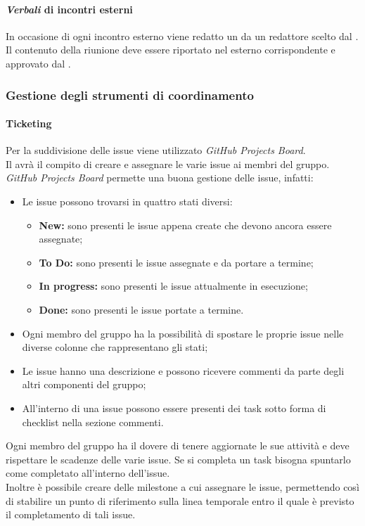 \paragraph {\textit{Verbali} di incontri esterni}
In occasione di ogni incontro esterno viene redatto un \docNameVLow{} da un redattore scelto dal \roleProjectManagerLow. Il contenuto della riunione deve essere riportato nel \docNameVLow{} esterno corrispondente e approvato dal \roleProjectManagerLow.

\subsubsection{Gestione degli strumenti di coordinamento}
\paragraph{Ticketing}
Per la suddivisione delle issue\glo{} viene utilizzato \textit{GitHub Projects Board}\glo{}.\\
Il \roleProjectManagerLow{} avrà il compito di creare e assegnare le varie issue\glo{} ai membri del gruppo.\\
\textit{GitHub Projects Board}\glo{} permette una buona gestione delle issue\glo{}, infatti:
\begin{itemize}
  \item Le issue\glo{} possono trovarsi in quattro stati diversi:
        \begin{itemize}
          \item \textbf{New:} sono presenti le issue\glo{} appena create che devono ancora essere assegnate;
          \item \textbf{To Do:} sono presenti le issue\glo{} assegnate e da portare a termine;
          \item \textbf{In progress:} sono presenti le issue\glo{} attualmente in esecuzione;
          \item \textbf{Done:} sono presenti le issue\glo{} portate a termine.
        \end{itemize}
  \item Ogni membro del gruppo ha la possibilità di spostare le proprie issue\glo{} nelle diverse colonne che rappresentano gli stati;
  \item Le issue\glo{} hanno una descrizione e possono ricevere commenti da parte degli altri componenti del gruppo;
  \item All'interno di una issue\glo{} possono essere presenti dei task sotto forma di checklist nella sezione commenti.
\end{itemize}
Ogni membro del gruppo ha il dovere di tenere aggiornate le sue attività e deve rispettare le scadenze delle varie issue\glo{}.
Se si completa un task bisogna spuntarlo come completato all'interno dell'issue\glo{}.\\
Inoltre è possibile creare delle milestone\glo{} a cui assegnare le issue\glo{}, permettendo così di stabilire un punto di
riferimento sulla linea temporale entro il quale è previsto il completamento di tali issue\glo{}.

